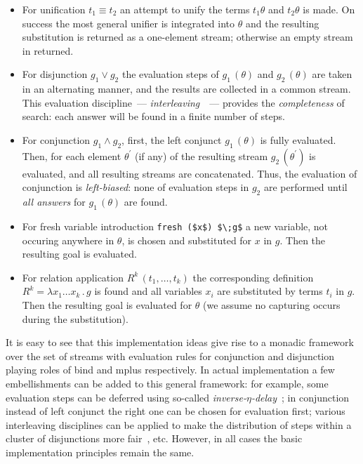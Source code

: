 \begin{itemize}
\item For unification $t_1 \equiv t_2$ an attempt to unify the terms $t_1\theta$ and $t_2\theta$ is made. On success the most general unifier is integrated into $\theta$ and the resulting substitution
  is returned as a one-element stream; otherwise an empty stream in returned.

\item For disjunction $g_1 \vee g_2$ the evaluation steps of $g_1\,(\theta)$ and $g_2\,(\theta)$ are taken in an alternating manner, and the results are collected in a common stream. This evaluation
  discipline~--- \emph{interleaving}~\cite{fair:interleaving}~--- provides the \emph{completeness} of \mk search: each answer will be found in a finite number of steps.

\item For conjunction $g_1 \wedge g_2$, first, the left conjunct $g_1\,(\theta)$ is fully evaluated. Then, for each element $\theta^\prime$ (if any) of the resulting stream $g_2\,(\theta^\prime)$ is
  evaluated, and all resulting streams are concatenated. Thus, the evaluation of conjunction is \emph{left-biased}: none of evaluation steps in $g_2$ are performed until \emph{all answers} for
  $g_1\,(\theta)$ are found.

\item For fresh variable introduction \lstinline|fresh ($x$) $\;g$| a new variable, not occuring anywhere in $\theta$, is chosen and substituted for $x$ in $g$. Then the resulting goal is evaluated.

\item For relation application $R^k\,(t_1,\dots,t_k)$ the corresponding definition $R^k=\lambda x_1\dots x_k\,.\,g$ is found and all variables $x_i$ are substituted by terms $t_i$ in
  $g$. Then the resulting goal is evaluated for $\theta$ (we assume no capturing occurs during the substitution).
\end{itemize}

It is easy to see that this implementation ideas give rise to a monadic framework over the set of streams with evaluation rules for conjunction and disjunction playing roles of bind and
mplus respectively. In actual implementation a few embellishments can be added to this general framework: for example, some evaluation steps can be deferred using so-called
\emph{inverse-$\eta$-delay}~\cite{MicroKanren}; in conjunction instead of left conjunct the right one can be chosen for evaluation first; various interleaving disciplines can
be applied to make the distribution of steps within a cluster of disjunctions more fair~\cite{fair:towardsAM}, etc. However, in all cases the basic implementation principles remain
the same.

